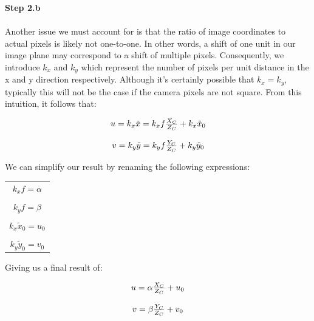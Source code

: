 \documentclass[]{article}
\begin{document}
\textbf{Step 2.b}\\\\
Another issue we must account for is that the ratio of image coordinates to actual pixels is likely not one-to-one. In other words, a shift of one unit in our image plane may correspond to a shift of multiple pixels. Consequently, we introduce $k_x$ and $k_y$ which represent the number of pixels per unit distance in the x and y direction respectively. Although it's certainly possible that $k_x = k_y$, typically this will not be the case if the camera pixels are not square. From this intuition, it follows that:

\begin{center}
\begin{equation}
\begin{tabular}{c}
  $u = k_x\tilde{x} = k_xf\frac{X_C}{Z_C} + k_x\tilde{x}_0$\\
  \\
  $v = k_y\tilde{y} = k_yf\frac{Y_C}{Z_C} + k_y\tilde{y}_0$
\end{tabular}
\end{equation}
\end{center}

We can simplify our result by renaming the following expressions:
\begin{center}
\begin{tabular}{c}
$k_xf = \alpha$\\
\\
$k_yf = \beta$\\
\\
$k_x\tilde{x}_0 = u_0$\\
\\
$k_y\tilde{y}_0 = v_0$
\end{tabular}
\end{center}

Giving us a final result of:

\begin{center}
\begin{equation}
\begin{tabular}{c}
  $u = \alpha\frac{X_C}{Z_C} + u_0$\\
  \\
  $v = \beta\frac{Y_C}{Z_C} + v_0$
\end{tabular}
\end{equation}
\end{center}
\end{document}
